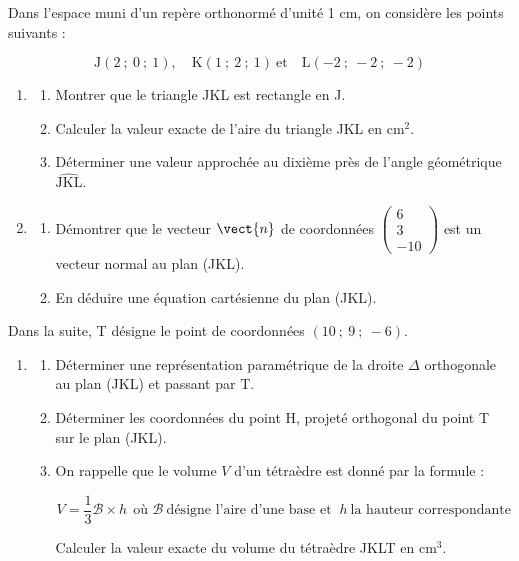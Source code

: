 \medskip

Dans l'espace muni d'un repère orthonormé \Oijk{} d'unité 1 cm, on considère les points suivants :

\[\text{J}(2~;~0~;~1), \quad \text{K}( 1~;~2~;~1)\:\text{et} \quad \text{L}(-2~;~-2~;~-2)\]

\begin{enumerate}
\item 
	\begin{enumerate}
		\item Montrer que le triangle JKL est rectangle en J.
		\item Calculer la valeur exacte de l'aire du triangle JKL en cm$^2$.
		\item Déterminer une valeur approchée au dixième près de l'angle géométrique $\widehat{\text{JKL}}$.
	\end{enumerate}
		
\item
	\begin{enumerate}
		\item Démontrer que le vecteur $\vect{n}$ de coordonnées $\begin{pmatrix}6\\3\\-10\end{pmatrix}$ est un vecteur normal au plan (JKL).
		\item En déduire une équation cartésienne du plan (JKL).
	\end{enumerate}
\end{enumerate}

Dans la suite, T désigne le point de coordonnées $(10~;~9~;~-6)$.

\begin{enumerate}[resume]
\item
	\begin{enumerate}
		\item Déterminer une représentation paramétrique de la droite $\Delta$
orthogonale au plan (JKL) et passant par T.
		\item Déterminer les coordonnées du point H, projeté orthogonal du point T sur le plan (JKL).
		\item On rappelle que le volume $V$ d'un tétraèdre est donné par la formule :
		
		\[V  = \dfrac13 \mathcal{B} \times h\:\: \text{où }  \mathcal{B}\:\text{désigne l'aire d'une base et } \: h \: \text{la hauteur correspondante}\]
		
Calculer la valeur exacte du volume du tétraèdre JKLT en cm$^3$.
	\end{enumerate}
\end{enumerate}

\bigskip
